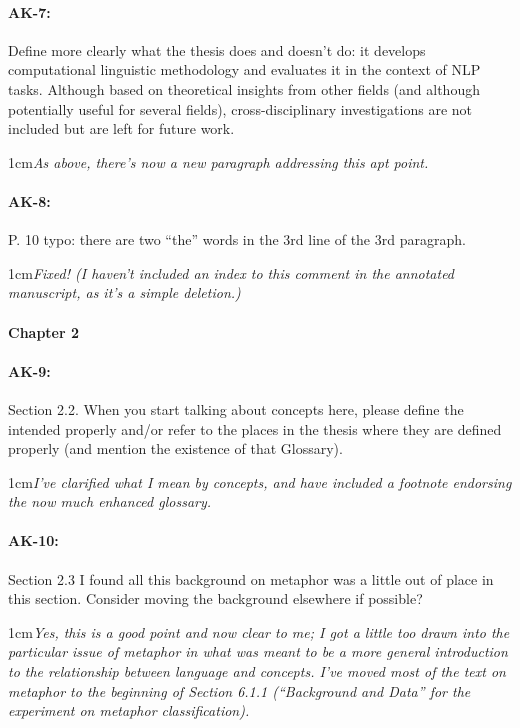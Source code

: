 \documentclass[11pt,a4paper]{article}
\newcommand{\res}[1]{\vspace{0.25cm} \begin{adjustwidth}{1cm}{}\emph{#1}\end{adjustwidth}}
\begin{document}
\paragraph{AK-7:} Define more clearly what the thesis does and doesn’t do: it develops computational linguistic methodology and evaluates it in the context of NLP tasks. Although based on theoretical insights from other fields (and although potentially useful for several fields), cross-disciplinary investigations are not included but are left for future work.

\res{As above, there's now a new paragraph addressing this apt point.}

\paragraph{AK-8:} P. 10 typo: there are two “the” words in the 3rd line of the 3rd paragraph.

\res{Fixed!  (I haven't included an index to this comment in the annotated manuscript, as it's a simple deletion.)}

\paragraph{Chapter 2}

\paragraph{AK-9:} Section 2.2. When you start talking about concepts here, please define the intended properly and/or refer to the places in the thesis where they are defined properly (and mention the existence of that Glossary).

\res{I've clarified what I mean by concepts, and have included a footnote endorsing the now much enhanced glossary.}

\paragraph{AK-10:} Section 2.3 I found all this background on metaphor was a little out of place in this section. Consider moving the background elsewhere if possible?

\res{Yes, this is a good point and now clear to me; I got a little too drawn into the particular issue of metaphor in what was meant to be a more general introduction to the relationship between language and concepts.  I've moved most of the text on metaphor to the beginning of Section 6.1.1 (``Background and Data'' for the experiment on metaphor classification).}
\end{document}
